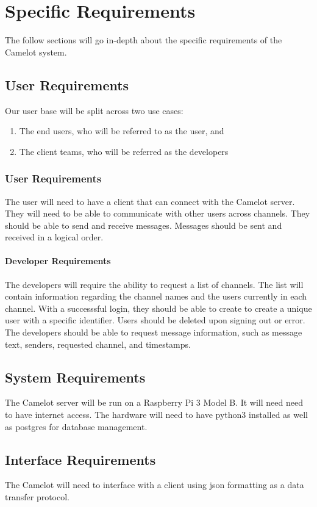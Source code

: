 \chapter{Specific Requirements}\label{specific-requirements}
The follow sections will go in-depth about the specific requirements of the Camelot system.

\section{User Requirements}\label{user-requirements}
Our user base will be split across two use cases:

\begin{enumerate}
    \item The end users, who will be referred to as the user, and
    \item The client teams, who will be referred as the developers
\end{enumerate}

\subsection{User Requirements}\label{user-requirements-1}
The user will need to have a client that can connect with the Camelot
server. They will need to be able to communicate with other users across
channels. They should be able to send and receive messages. Messages
should be sent and received in a logical order.

\subsubsection{Developer Requirements}\label{developer-requirements}
The developers will require the ability to request a list
of channels. The list will contain information regarding the channel
names and the users currently in each channel. With a successsful login,
they should be able to create to create a unique user with a specific
identifier. Users should be deleted upon signing out or error. The
developers should be able to request message information, such as
message text, senders, requested channel, and timestamps.

\section{System Requirements}\label{system-requirements}
The Camelot server will be run on a Raspberry Pi 3 Model B. It will need
need to have internet access. The hardware will need to have \gls{python}3
installed as well as \gls{postgres} for database management.

\section{Interface Requirements}\label{interface-requirements}
The Camelot will need to interface with a client using \gls{json} formatting
as a data transfer protocol.
